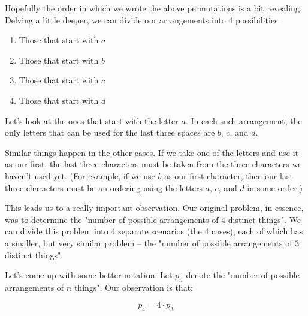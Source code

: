 Hopefully the order in which we wrote the above permutations is a bit revealing. Delving a little deeper, we can divide our arrangements into 4 possibilities:

\begin{enumerate}
\item Those that start with $a$
\item Those that start with $b$
\item Those that start with $c$
\item Those that start with $d$
\end{enumerate}

Let's look at the ones that start with the letter $a$. In each such arrangement, the only letters that can be used for the last three spaces are $b$, $c$, and $d$. 

Similar things happen in the other cases. If we take one of the letters and use it as our first, the last three characters must be taken from the three characters we haven't used yet. (For example, if we use $b$ as our first character, then our last three characters must be an ordering using the letters $a$, $c$, and $d$ in some order.) %

This leads us to a really important observation. Our original problem, in essence, was to determine the "number of possible arrangements of 4 distinct things". We can divide this problem into 4 separate scenarios (the 4 cases), each of which has a smaller, but very similar problem -- the "number of possible arrangements of 3 distinct things".



Let's come up with some better notation. Let $p_n$ denote the "number of possible arrangements of $n$ things". Our observation is that:

\begin{equation*}
p_4 = 4 \cdot p_3
\end{equation*}



